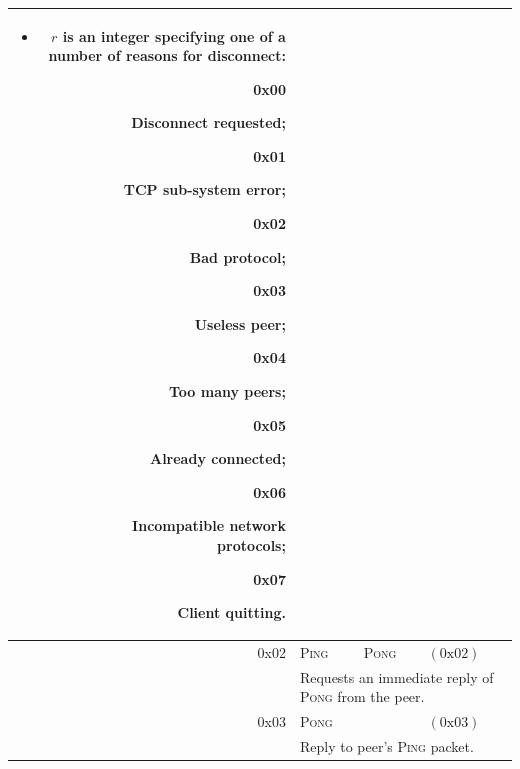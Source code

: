 \begin{tabular*}{\columnwidth}[h]{rlll}
{\begin{itemize}
\item $r$ is an integer specifying one of a number of reasons for disconnect:
\begin{description}
\item[0x00] Disconnect requested;
\item[0x01] TCP sub-system error;
\item[0x02] Bad protocol;
\item[0x03] Useless peer;
\item[0x04] Too many peers;
\item[0x05] Already connected;
\item[0x06] Incompatible network protocols;
\item[0x07] Client quitting.
\end{description}
\end{itemize}
}\\
\midrule
0x02 & \textsc{Ping} & \textsc{Pong} & $(\text{0x}02)$ \\
& \multicolumn{3}{p{0.8\columnwidth}}{Requests an immediate reply of \textsc{Pong} from the peer.}\\
\midrule
0x03 & \textsc{Pong} && $(\text{0x}03)$ \\
& \multicolumn{3}{p{0.8\columnwidth}}{Reply to peer's \textsc{Ping} packet.}\\
\bottomrule
\end{tabular*}


